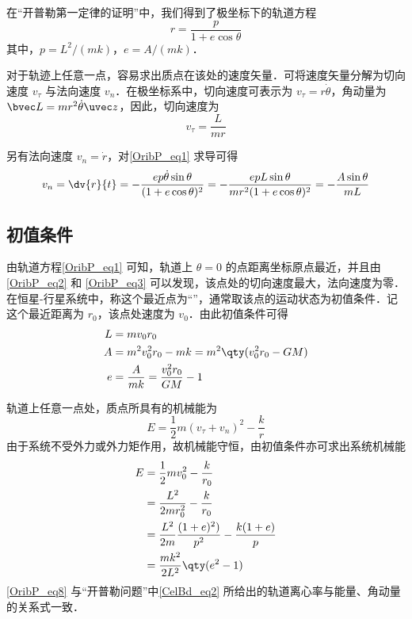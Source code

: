 

在“开普勒第一定律的证明”中，我们得到了极坐标下的轨道方程
\begin{equation}\label{OribP_eq1} 
r=\frac{p}{1+e \cos\theta}
\end{equation}
其中，$p=L^2/(mk)$，$e=A/(mk)$．

对于轨迹上任意一点，容易求出质点在该处的速度矢量．可将速度矢量分解为切向速度 $v_\tau$ 与法向速度 $v_n$．在极坐标系中，切向速度可表示为 $v_\tau =r \dot\theta$，角动量为 $\bvec L  = mr^2\dot{\theta}\uvec z$，因此，切向速度为
\begin{equation}\label{OribP_eq2} 
v_\tau =\frac{L}{mr}
\end{equation}

另有法向速度 $v_n=\dot r$，对\autoref{OribP_eq1} 求导可得
\begin{equation} \label{OribP_eq3}
v_n =\dv{r}{t}=-\frac{ep\dot{\theta}\sin\theta}{(1+e\cos\theta)^2}=-\frac{epL\sin\theta}{mr^2(1+e\cos\theta)^2}=-\frac{A\sin\theta}{mL}
\end{equation}

\subsection{初值条件}
由轨道方程\autoref{OribP_eq1} 可知，轨道上 $\theta=0$ 的点距离坐标原点最近，并且由\autoref{OribP_eq2} 和 \autoref{OribP_eq3} 可以发现，该点处的切向速度最大，法向速度为零．在恒星-行星系统中，称这个最近点为“”，通常取该点的运动状态为初值条件．记这个最近距离为 $r_0$，该点处速度为 $v_0$．由此初值条件可得
\begin{align}
L &= mv_0r_0\\
A &= m^2v_0^2r_0-mk=m^2\qty(v_0^2r_0-GM)\\
e &= \frac{A}{mk}=\frac{v_0^2r_0}{GM}-1 
\end{align}

轨道上任意一点处，质点所具有的机械能为
\begin{equation} 
E =\frac{1}{2}m(v_{\tau}+v_n)^2-\frac{k}{r}
\end{equation}
由于系统不受外力或外力矩作用，故机械能守恒，由初值条件亦可求出系统机械能
\begin{equation} \label{OribP_eq8}
\begin{aligned}
E &=\frac{1}{2}mv_0^2-\frac{k}{r_0}\\
   &=\frac{L^2}{2mr_0^2}-\frac{k}{r_0}\\
   &=\frac{L^2}{2m}\frac{(1+e)^2)}{p^2}-\frac{k(1+e)}{p}\\
   &=\frac{mk^2}{2L^2}\qty(e^2-1)
\end{aligned}
\end{equation}
\autoref{OribP_eq8} 与“开普勒问题”中\autoref{CelBd_eq2} 所给出的轨道离心率与能量、角动量的关系式一致．

